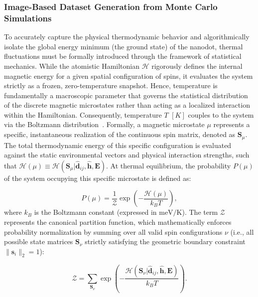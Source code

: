 \documentclass[letterpaper, 12, one column]{article}
\begin{document}
\subsubsection{Image-Based Dataset Generation from Monte Carlo Simulations}\label{sec:montecarlo_sim}

To accurately capture the physical thermodynamic behavior and algorithmically isolate the global energy minimum (the ground state) of the nanodot, thermal fluctuations must be formally introduced through the framework of statistical mechanics. While the atomistic Hamiltonian $\mathcal{H}$ rigorously defines the internal magnetic energy for a given spatial configuration of spins, it evaluates the system strictly as a frozen, zero-temperature snapshot. Hence, temperature is fundamentally a macroscopic parameter that governs the statistical distribution of the discrete magnetic microstates rather than acting as a localized interaction within the Hamiltonian. Consequently, temperature $T$ $[K]$ couples to the system via the Boltzmann distribution~\cite{eriksson2017atomistic}. Formally, a magnetic microstate $\mu$ represents a specific, instantaneous realization of the continuous spin matrix, denoted as $\mathbf{S}_\mu$. The total thermodynamic energy of this specific configuration is evaluated against the static environmental vectors and physical interaction strengths, such that $\mathcal{H}(\mu) \equiv \mathcal{H}\left(\mathbf{S}_\mu|\mathbf{\hat{d}}_{ij},\hat{\mathbf{h}},\mathbf{E}\right)$. At thermal equilibrium, the probability $P(\mu)$ of the system occupying this specific microstate is defined as:

\begin{equation}\label{eq:Boltzmann}
P(\mu) = \frac{1}{\mathcal{Z}} \exp\left(-\frac{\mathcal{H}(\mu)}{k_B T}\right),
\end{equation}
where $k_B$ is the Boltzmann constant (expressed in $\text{meV/K}$). The term $\mathcal{Z}$ represents the canonical partition function, which mathematically enforces probability normalization by summing over all valid spin configurations $\nu$ (i.e., all possible state matrices $\mathbf{S}_\nu$ strictly satisfying the geometric boundary constraint $\|\mathbf{s}_i\|_2 = 1$):

\begin{equation}\label{eq:PartitionFunction}
\mathcal{Z} = \sum_{\mathbf{S}_\nu} \exp\left(-\frac{\mathcal{H}\left(\mathbf{S}_\nu|\mathbf{\hat{d}}_{ij},\hat{\mathbf{h}},\mathbf{E}\right)}{k_B T}\right).
\end{equation}
\end{document}
